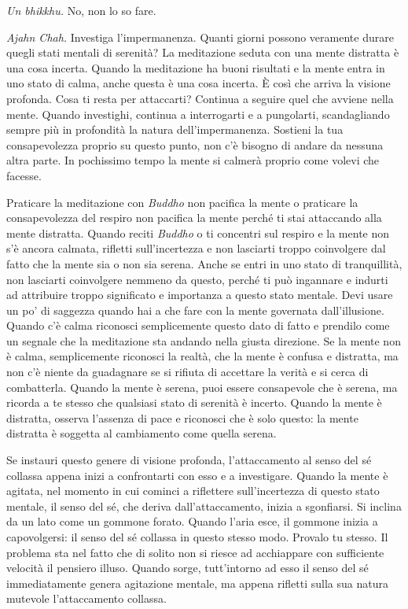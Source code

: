 \emph{Un bhikkhu.} No, non lo so fare.

\emph{Ajahn Chah.} Investiga l'impermanenza. Quanti giorni possono veramente
durare quegli stati mentali di serenità? La meditazione seduta con una
mente distratta è una cosa incerta. Quando la meditazione ha buoni
risultati e la mente entra in uno stato di calma, anche questa è una
cosa incerta. È così che arriva la visione profonda. Cosa ti resta per
attaccarti? Continua a seguire quel che avviene nella mente. Quando
investighi, continua a interrogarti e a pungolarti, scandagliando sempre
più in profondità la natura dell'impermanenza. Sostieni la tua
consapevolezza proprio su questo punto, non c'è bisogno di andare da
nessuna altra parte. In pochissimo tempo la mente si calmerà proprio
come volevi che facesse.

Praticare la meditazione con \emph{Buddho} non pacifica la mente o
praticare la consapevolezza del respiro non pacifica la mente perché ti
stai attaccando alla mente distratta. Quando reciti \emph{Buddho} o ti
concentri sul respiro e la mente non s'è ancora calmata, rifletti
sull'incertezza e non lasciarti troppo coinvolgere dal fatto che la
mente sia o non sia serena. Anche se entri in uno stato di tranquillità,
non lasciarti coinvolgere nemmeno da questo, perché ti può ingannare e
indurti ad attribuire troppo significato e importanza a questo stato
mentale. Devi usare un po' di saggezza quando hai a che fare con la
mente governata dall'illusione. Quando c'è calma riconosci semplicemente
questo dato di fatto e prendilo come un segnale che la meditazione sta
andando nella giusta direzione. Se la mente non è calma, semplicemente
riconosci la realtà, che la mente è confusa e distratta, ma non c'è
niente da guadagnare se si rifiuta di accettare la verità e si cerca di
combatterla. Quando la mente è serena, puoi essere consapevole che è
serena, ma ricorda a te stesso che qualsiasi stato di serenità è
incerto. Quando la mente è distratta, osserva l'assenza di pace e
riconosci che è solo questo: la mente distratta è soggetta al
cambiamento come quella serena.

Se instauri questo genere di visione profonda, l'attaccamento al senso
del sé collassa appena inizi a confrontarti con esso e a investigare.
Quando la mente è agitata, nel momento in cui cominci a riflettere
sull'incertezza di questo stato mentale, il senso del sé, che deriva
dall'attaccamento, inizia a sgonfiarsi. Si inclina da un lato come un
gommone forato. Quando l'aria esce, il gommone inizia a capovolgersi: il
senso del sé collassa in questo stesso modo. Provalo tu stesso. Il
problema sta nel fatto che di solito non si riesce ad acchiappare con
sufficiente velocità il pensiero illuso. Quando sorge, tutt'intorno ad
esso il senso del sé immediatamente genera agitazione mentale, ma appena
rifletti sulla sua natura mutevole l'attaccamento collassa.

